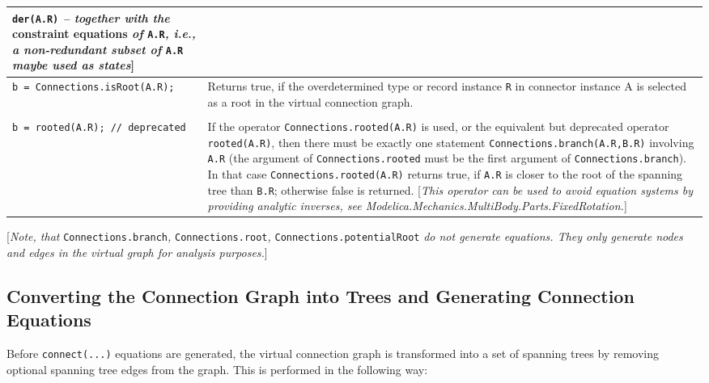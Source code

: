 \begin{longtable}[]{|p{5.1cm}|p{10cm}|}
\lstinline!der(A.R)! \emph{-- together with the} constraint equations \emph{of}
\lstinline!A.R!\emph{, i.e., a non-redundant subset of} \lstinline!A.R! \emph{maybe used as
states}{]}
\\ \hline
\lstinline!b = Connections.isRoot(A.R);! & Returns true, if the overdetermined type
or record instance \lstinline!R! in connector instance A is selected as a root in
the virtual connection graph.\\ \hline
\begin{tabular}{@{}p{5.1cm}@{}}
\lstinline!b = Connections.rooted(A.R);!\\
\lstinline!b = rooted(A.R); // deprecated!
\end{tabular}
& If the operator \lstinline!Connections.rooted(A.R)!
is used, or the equivalent but deprecated operator \lstinline!rooted(A.R)!, then
there must be exactly one statement \lstinline!Connections.branch(A.R,B.R)!
involving \lstinline!A.R! (the argument of \lstinline!Connections.rooted! must be the first
argument of \lstinline!Connections.branch!). In that case \lstinline!Connections.rooted(A.R)!
returns true, if \lstinline!A.R! is closer to the root of the spanning tree than
\lstinline!B.R!; otherwise false is returned. {[}\emph{This operator can be used to
avoid equation systems by providing analytic inverses, see
Modelica.Mechanics.MultiBody.Parts.FixedRotation.}{]}\\ \hline
\end{longtable}

{[}\emph{Note, that} \lstinline!Connections.branch!\emph{,} \lstinline!Connections.root!\emph{,}
\lstinline!Connections.potentialRoot! \emph{do not generate equations. They only
generate nodes and edges in the virtual graph for analysis
purposes.}{]}

\subsection{Converting the Connection Graph into Trees and Generating Connection Equations}

Before \lstinline!connect(...)! equations are generated, the virtual connection
graph is transformed into a set of spanning trees by removing optional spanning tree edges
from the graph. This is performed in the following way:

